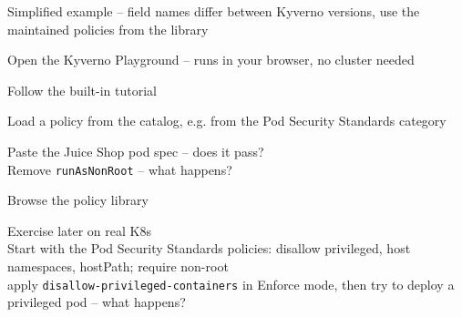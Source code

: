 \documentclass[Screen16to9,17pt]{foils}
\begin{document}
Simplified example -- field names differ between Kyverno versions, use the maintained policies from the library



\begin{list2}
\item Open the Kyverno Playground -- runs in your browser, no cluster needed\\
{\footnotesize{}}
\item Follow the built-in tutorial
\item Load a policy from the catalog, e.g. from the Pod Security Standards category
\item Paste the Juice Shop pod spec -- does it pass?\\
Remove \verb+runAsNonRoot+ -- what happens?
\item Browse the policy library 

\item Exercise later on real K8s\\
 Start with the Pod Security Standards policies:
disallow privileged, host namespaces, hostPath; require non-root\\
apply \verb+disallow-privileged-containers+ in Enforce mode,
      then try to deploy a privileged pod -- what happens?
  \end{list2}


\breakdance





\end{document}
